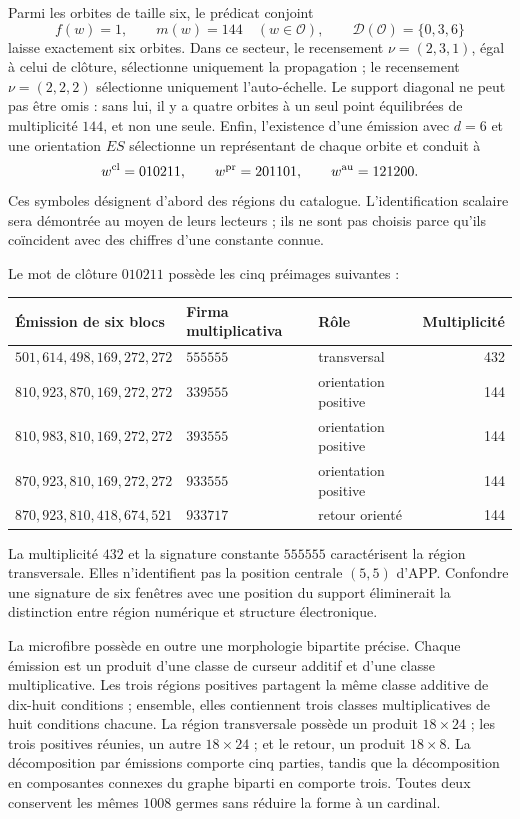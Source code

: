 Parmi les orbites de taille six, le prédicat conjoint
\[
 f(w)=1,\qquad m(w)=144\quad(w\in\mathcal O),\qquad
 \mathcal D(\mathcal O)=\{0,3,6\}
\]
laisse exactement six orbites. Dans ce secteur, le recensement \(\nu=(2,3,1)\), égal à celui de clôture, sélectionne uniquement la propagation ; le recensement \(\nu=(2,2,2)\) sélectionne uniquement l'auto-échelle. Le support diagonal ne peut pas être omis : sans lui, il y a quatre orbites à un seul point équilibrées de multiplicité \(144\), et non une seule. Enfin, l'existence d'une émission avec \(d=6\) et une orientation \(ES\) sélectionne un représentant de chaque orbite et conduit à
\begin{equation}
 w^{\rm cl}=010211,\qquad w^{\rm pr}=201101,\qquad w^{\rm au}=121200.
 \label{x_reciprocidad:eq:palabras-regionales}
\end{equation}
Ces symboles désignent d'abord des régions du catalogue. L'identification scalaire sera démontrée au moyen de leurs lecteurs ; ils ne sont pas choisis parce qu'ils coïncident avec des chiffres d'une constante connue.

Le mot de clôture \(010211\) possède les cinq préimages suivantes :
\begin{center}\small
\begin{tabular}{@{}lll r@{}}\toprule
Émission de six blocs&Firma multiplicativa&Rôle&Multiplicité\\\midrule
\(501,614,498,169,272,272\)&\(555555\)&transversal&432\\
\(810,923,870,169,272,272\)&\(339555\)&orientation positive&144\\
\(810,983,810,169,272,272\)&\(393555\)&orientation positive&144\\
\(870,923,810,169,272,272\)&\(933555\)&orientation positive&144\\
\(870,923,810,418,674,521\)&\(933717\)&retour orienté&144\\\bottomrule
\end{tabular}
\end{center}
La multiplicité \(432\) et la signature constante \(555555\) caractérisent la région transversale. Elles n'identifient pas la position centrale \((5,5)\) d'APP. Confondre une signature de six fenêtres avec une position du support éliminerait la distinction entre région numérique et structure électronique.

La microfibre possède en outre une morphologie bipartite précise. Chaque émission est un produit d'une classe de curseur additif et d'une classe multiplicative. Les trois régions positives partagent la même classe additive de dix-huit conditions ; ensemble, elles contiennent trois classes multiplicatives de huit conditions chacune. La région transversale possède un produit \(18\times24\) ; les trois positives réunies, un autre \(18\times24\) ; et le retour, un produit \(18\times8\). La décomposition par émissions comporte cinq parties, tandis que la décomposition en composantes connexes du graphe biparti en comporte trois. Toutes deux conservent les mêmes \(1008\) germes sans réduire la forme à un cardinal.

